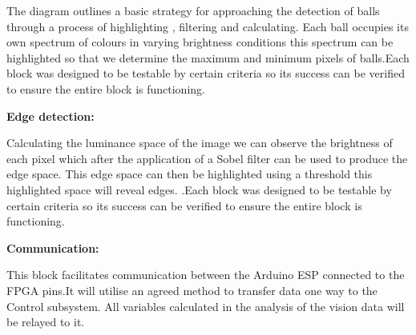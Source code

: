 \documentclass[10pt,twoside]{article}
\begin{document}
The diagram outlines a basic strategy for approaching the detection of balls through a process of highlighting , filtering and calculating. Each  ball occupies its own spectrum of colours in varying brightness conditions this spectrum can be highlighted so that we determine the maximum and minimum pixels of balls.Each block was designed to be testable by certain criteria so its success can be verified to ensure the entire block is functioning. 

\textbf{Edge detection:}

Calculating the luminance space of the image we can observe the brightness of each pixel which after the
application of a Sobel filter can be used to produce the edge space. This edge space can then be highlighted
using a threshold this highlighted space will reveal edges. .Each block was designed to be testable by certain
criteria so its success can be verified to ensure the entire block is functioning.

\textbf{Communication:}

This block facilitates communication between the Arduino ESP connected to the FPGA pins.It will utilise an agreed method to transfer data one way to the Control subsystem. All variables calculated in the analysis of the vision data will be relayed to it.
\end{document}
